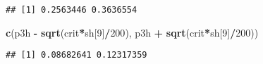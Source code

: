 \documentclass[
]{article}
\newenvironment{Shaded}{\begin{snugshade}}{\end{snugshade}}
\newcommand{\DecValTok}[1]{\textcolor[rgb]{0.00,0.00,0.81}{#1}}
\newcommand{\FunctionTok}[1]{\textcolor[rgb]{0.13,0.29,0.53}{\textbf{#1}}}
\newcommand{\NormalTok}[1]{#1}
\newcommand{\SpecialCharTok}[1]{\textcolor[rgb]{0.81,0.36,0.00}{\textbf{#1}}}
\begin{document}
\begin{verbatim}
## [1] 0.2563446 0.3636554
\end{verbatim}

\begin{Shaded}
\begin{Highlighting}[]
\FunctionTok{c}\NormalTok{(p3h }\SpecialCharTok{{-}} \FunctionTok{sqrt}\NormalTok{(crit}\SpecialCharTok{*}\NormalTok{sh[}\DecValTok{9}\NormalTok{]}\SpecialCharTok{/}\DecValTok{200}\NormalTok{), p3h }\SpecialCharTok{+} \FunctionTok{sqrt}\NormalTok{(crit}\SpecialCharTok{*}\NormalTok{sh[}\DecValTok{9}\NormalTok{]}\SpecialCharTok{/}\DecValTok{200}\NormalTok{))}
\end{Highlighting}
\end{Shaded}

\begin{verbatim}
## [1] 0.08682641 0.12317359
\end{verbatim}
\end{document}
